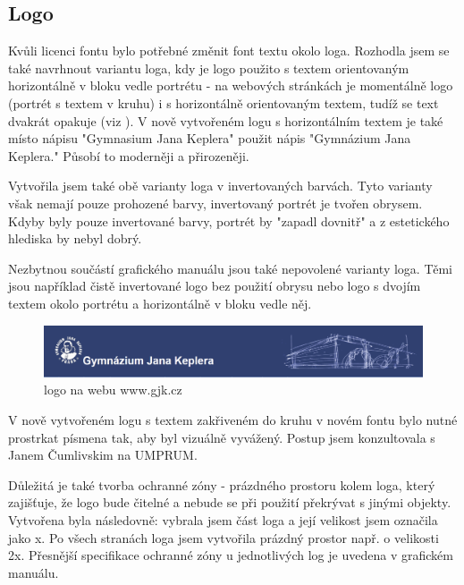 \documentclass[11pt,a4paper,twoside,openright]{report}
\begin{document}
\subsection{Logo}
Kvůli licenci fontu bylo potřebné změnit font textu okolo loga.
Rozhodla jsem se také navrhnout variantu loga, kdy je logo použito s textem orientovaným horizontálně v bloku vedle portrétu - na webových stránkách je momentálně logo (portrét s textem v kruhu) i s horizontálně orientovaným textem, tudíž se text dvakrát opakuje (viz ). V nově vytvořeném logu s horizontálním textem je také místo nápisu "Gymnasium Jana Keplera" použit nápis "Gymnázium Jana Keplera." Působí to moderněji a přirozeněji.

Vytvořila jsem také obě varianty loga v invertovaných barvách. Tyto varianty však nemají pouze prohozené barvy, invertovaný portrét je tvořen obrysem. Kdyby byly pouze invertované barvy, portrét by "zapadl dovnitř" a z estetického hlediska by nebyl dobrý.

Nezbytnou součástí grafického manuálu jsou také nepovolené varianty loga. Těmi jsou například čistě invertované logo bez použití obrysu nebo logo s dvojím textem okolo portrétu a horizontálně v bloku vedle něj.

\begin{figure}[htbp]
  \includegraphics[width=1\textwidth]{img/gjk_web_hlavicka.png}
  \caption{logo na webu www.gjk.cz}
  \label{fig:logo_web}
\end{figure}


V nově vytvořeném logu s textem zakřiveném do kruhu v novém fontu bylo nutné prostrkat písmena tak, aby byl vizuálně vyvážený. Postup jsem konzultovala s Janem Čumlivskim na UMPRUM.

Důležitá je také tvorba ochranné zóny - prázdného prostoru kolem loga, který zajišťuje, že logo bude čitelné a nebude se při použití překrývat s jinými objekty. Vytvořena byla následovně: vybrala jsem část loga a její velikost jsem označila jako x. Po všech stranách loga jsem vytvořila prázdný prostor např. o velikosti 2x. Přesnější specifikace ochranné zóny u jednotlivých log je uvedena v grafickém manuálu.
\end{document}
